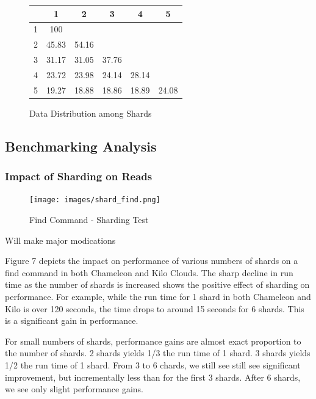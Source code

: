 \documentclass[9pt,twocolumn,twoside]{styles/osajnl}
\begin{document}
\begin{figure}[ht]
\begin{center}
 \begin{tabular}{| c | c | c | c | c | c |} 
 \hline
  &  1    &  2    &  3    &   4   & 5 \\ [0.5ex]
\hline
  \hline
1 & 100   &       &       &       &   \\
\hline
2 & 45.83 & 54.16 &       &       &   \\
\hline
3 & 31.17 & 31.05 & 37.76 &       &   \\
\hline
4 & 23.72 & 23.98 & 24.14 & 28.14 &   \\
\hline
5 & 19.27 & 18.88 & 18.86 & 18.89 & 24.08   \\
\hline
\end{tabular}
\end{center}
  \caption{Data Distribution among Shards}
\end{figure}





\subsection{Benchmarking Analysis}

\subsubsection{Impact of Sharding on Reads}

\begin{figure}[!ht]
  \texttt{[image: images/shard\_find.png]}
  \caption{Find Command - Sharding Test}
\end{figure}

Will make major modications

Figure 7 depicts the impact on performance of various numbers of shards on a find command in both Chameleon and Kilo Clouds.  The sharp decline in run time as the number of shards is increased shows the positive effect of sharding on performance.  For example, while the run time for 1 shard in both Chameleon and Kilo is over 120 seconds, the time drops to around 15 seconds for 6 shards.  This is a significant gain in performance.  

For small numbers of shards, performance gains are almost exact proportion to the number of shards.  2 shards yields 1/3 the run time of 1 shard.  3 shards yields 1/2 the run time of 1 shard.  From 3 to 6 chards, we still see still see significant improvement, but incrementally less than for the first 3 shards.  After 6 shards, we see only slight performance gains.
\end{document}
